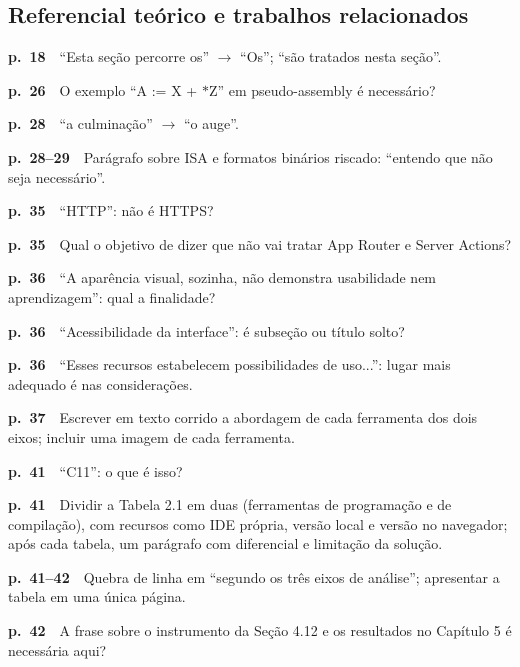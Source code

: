 \documentclass[11pt,a4paper]{article}
\newcommand{\pg}[1]{\textbf{p.~#1}\ \ }
\begin{document}
\subsection*{Referencial teórico e trabalhos relacionados}
\begin{checklist}
  \item \pg{18}“Esta seção percorre os” $\rightarrow$ “Os”; “são tratados nesta seção”.
  \item \pg{26}O exemplo “A := X + $*$Z” em pseudo-assembly é necessário?
  \item \pg{28}“a culminação” $\rightarrow$ “o auge”.
  \item \pg{28--29}Parágrafo sobre ISA e formatos binários riscado: “entendo que não seja necessário”.
  \item \pg{35}“HTTP”: não é HTTPS?
  \item \pg{35}Qual o objetivo de dizer que não vai tratar App Router e Server Actions?
  \item \pg{36}“A aparência visual, sozinha, não demonstra usabilidade nem aprendizagem”: qual a finalidade?
  \item \pg{36}“Acessibilidade da interface”: é subseção ou título solto?
  \item \pg{36}“Esses recursos estabelecem possibilidades de uso...”: lugar mais adequado é nas considerações.
  \item \pg{37}Escrever em texto corrido a abordagem de cada ferramenta dos dois eixos; incluir uma imagem de cada ferramenta.
  \item \pg{41}“C11”: o que é isso?
  \item \pg{41}Dividir a Tabela 2.1 em duas (ferramentas de programação e de compilação), com recursos como IDE própria, versão local e versão no navegador; após cada tabela, um parágrafo com diferencial e limitação da solução.
  \item \pg{41--42}Quebra de linha em “segundo os três eixos de análise”; apresentar a tabela em uma única página.
  \item \pg{42}A frase sobre o instrumento da Seção 4.12 e os resultados no Capítulo 5 é necessária aqui?
\end{checklist}
\end{document}
